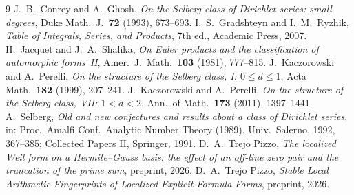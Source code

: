 \documentclass[11pt]{amsart}
\theoremstyle{definition}
\theoremstyle{remark}
\begin{document}
\begin{thebibliography}{9}
 J.~B.~Conrey and A.~Ghosh, \emph{On the Selberg class of Dirichlet series: small degrees}, Duke Math.\ J.\ \textbf{72} (1993), 673--693.
 I.~S.~Gradshteyn and I.~M.~Ryzhik, \emph{Table of Integrals, Series, and Products}, 7th ed., Academic Press, 2007.
 H.~Jacquet and J.~A.~Shalika, \emph{On Euler products and the classification of automorphic forms~II}, Amer.\ J.\ Math.\ \textbf{103} (1981), 777--815.
 J.~Kaczorowski and A.~Perelli, \emph{On the structure of the Selberg class, I: $0\le d\le1$}, Acta Math.\ \textbf{182} (1999), 207--241.
 J.~Kaczorowski and A.~Perelli, \emph{On the structure of the Selberg class, VII: $1<d<2$}, Ann.\ of Math.\ \textbf{173} (2011), 1397--1441.
 A.~Selberg, \emph{Old and new conjectures and results about a class of Dirichlet series}, in: Proc.\ Amalfi Conf.\ Analytic Number Theory (1989), Univ.\ Salerno, 1992, 367--385; Collected Papers II, Springer, 1991.
 D.~A.~Trejo Pizzo, \emph{The localized Weil form on a Hermite--Gauss basis: the effect of an off-line zero pair and the truncation of the prime sum}, preprint, 2026.
 D.~A.~Trejo Pizzo, \emph{Stable Local Arithmetic Fingerprints of Localized Explicit-Formula Forms}, preprint, 2026.
\end{thebibliography}
\end{document}
